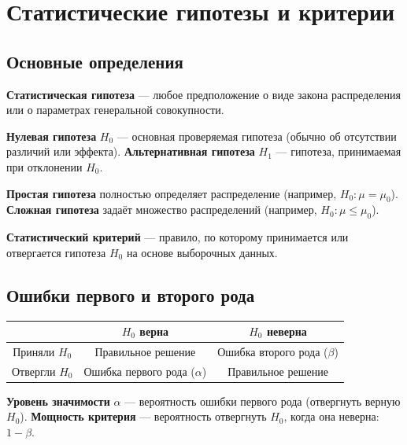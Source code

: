 \documentclass[10pt]{article}
\begin{document}
\section{Статистические гипотезы и критерии}

\subsection{Основные определения}

\begin{definition}
\textbf{Статистическая гипотеза} — любое предположение о виде закона распределения или о параметрах генеральной совокупности.
\end{definition}

\begin{definition}
\textbf{Нулевая гипотеза} $H_0$ — основная проверяемая гипотеза (обычно об отсутствии различий или эффекта).
\textbf{Альтернативная гипотеза} $H_1$ — гипотеза, принимаемая при отклонении $H_0$.
\end{definition}

\begin{definition}
\textbf{Простая гипотеза} полностью определяет распределение (например, $H_0: \mu = \mu_0$).
\textbf{Сложная гипотеза} задаёт множество распределений (например, $H_0: \mu \le \mu_0$).
\end{definition}

\begin{definition}
\textbf{Статистический критерий} — правило, по которому принимается или отвергается гипотеза $H_0$ на основе выборочных данных.
\end{definition}

\subsection{Ошибки первого и второго рода}

\begin{tabular}{|c|c|c|}
\hline
& $H_0$ верна & $H_0$ неверна \\
\hline
Приняли $H_0$ & Правильное решение & Ошибка второго рода ($\beta$) \\
\hline
Отвергли $H_0$ & Ошибка первого рода ($\alpha$) & Правильное решение \\
\hline
\end{tabular}

\begin{definition}
\textbf{Уровень значимости} $\alpha$ — вероятность ошибки первого рода (отвергнуть верную $H_0$).
\textbf{Мощность критерия} — вероятность отвергнуть $H_0$, когда она неверна: $1 - \beta$.
\end{definition}
\end{document}

